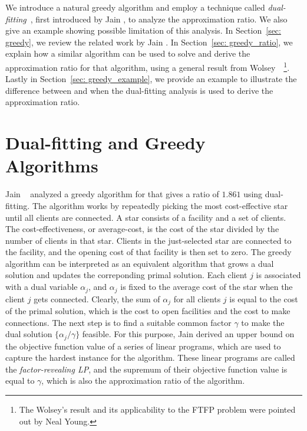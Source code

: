 \documentclass[oneside,final]{ucr}
\begin{document}
We introduce a natural greedy algorithm and employ a
technique called \emph{dual-fitting}~\cite{JainMMSV03},
first introduced by Jain {\etal}, to analyze the
approximation ratio. We also give an example showing
possible limitation of this analysis.  In Section~\ref{sec:
  greedy}, we review the related work by Jain {\etal}.  In
Section~\ref{sec: greedy_ratio}, we explain how a similar
algorithm can be used to solve {\FTFP} and derive the
approximation ratio for that algorithm, using a general
result from Wolsey~\cite{Wolsey88}~\footnote{The Wolsey's
  result and its applicability to the FTFP problem were
  pointed out by Neal Young.}. Lastly in Section~\ref{sec:
  greedy_example}, we provide an example to illustrate the
difference between {\UFL} and {\FTFP} when the dual-fitting
analysis is used to derive the approximation ratio.

\section{Dual-fitting and Greedy Algorithms}
\label{sec: greedy}

Jain {\etal}~\cite{JainMMSV03} analyzed a greedy algorithm
for {\UFL} that gives a ratio of $1.861$ using
dual-fitting. The algorithm works by repeatedly picking the
most cost-effective star until all clients are connected. A
star consists of a facility and a set of clients. The
cost-effectiveness, or average-cost, is the cost of the star
divided by the number of clients in that star. Clients in
the just-selected star are connected to the facility, and
the opening cost of that facility is then set to zero. The
greedy algorithm can be interpreted as an equivalent
algorithm that grows a dual solution and updates the
correponding primal solution. Each client $j$ is associated
with a dual variable $\alpha_j$, and $\alpha_j$ is fixed to
the average cost of the star when the client $j$ gets
connected. Clearly, the sum of $\alpha_j$ for all clients
$j$ is equal to the cost of the primal solution, which is
the cost to open facilities and the cost to make
connections. The next step is to find a suitable common
factor $\gamma$ to make the dual solution $\{\alpha_j /
\gamma\}$ feasible. For this purpose, Jain {\etal} derived
an upper bound on the objective function value of a series
of linear programs, which are used to capture the hardest
instance for the algorithm. These linear programs are called
the \emph{factor-revealing LP}, and the supremum of their
objective function value is equal to $\gamma$, which is also
the approximation ratio of the algorithm.
\end{document}
